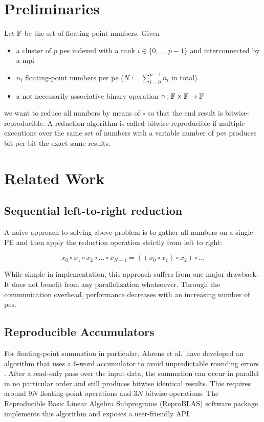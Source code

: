 \section{Preliminaries}
\label{sec:Preliminaries}
Let $\mathbb{F}$ be the set of floating-point numbers. Given
\begin{itemize}
\item a cluster of $p$ \glspl{pe} indexed with a rank $i \in \{0, \ldots, p - 1\}$ and interconnected by a \gls{mpi}
\item $n_i$ floating-point numbers per \gls{pe} ($N := \sum_{i=0}^{p-1} n_i$ in total)
\item a not necessarily associative binary operation $\circ: \mathbb{F} \times \mathbb{F} \rightarrow \mathbb{F}$
\end{itemize}
we want to reduce all numbers by means of $\circ$ so that the end result is bitwise-reproducible.
A reduction algorithm is called bitwise-reproducible if multiple executions over the same set of numbers with a variable
number of \glspl{pe} produces bit-per-bit the exact same results.


\section{Related Work}
\label{sec:RelatedWork}

\subsection{Sequential left-to-right reduction}
\label{sec:SequentialLeftToRightReduction}


A naive approach to solving above problem is to gather all numbers on a single PE and then apply the reduction
operation strictly from left to right:

\begin{equation}
x_0 \circ x_1 \circ x_2 \circ \ldots  \circ x_{N-1} = ((x_0 \circ x_1) \circ x_2) \circ \ldots
\end{equation}

While simple in implementation, this approach suffers from one major drawback. It does not benefit from any
parallelization whatsoever. Through the communication overhead, performance decreases with
an increasing number of \glspl{pe}.


\subsection{Reproducible Accumulators}
\label{sec:Reproducible Accumulators}
For floating-point summation in particular, Ahrens et al.\ have developed an algorithm that uses a 6-word accumulator
to avoid unpredictable rounding errors \cite{ahrens_algorithms_2020}. After a read-only pass over the input data,
the summation can occur in parallel in no particular order and still produces bitwise identical results.
This requires around $9N$ floating-point operations and $3N$ bitwise operations.
The Reproducible Basic Linear Algebra Subprograms (ReproBLAS) software package implements this algorithm and
exposes a user-friendly API.\@

